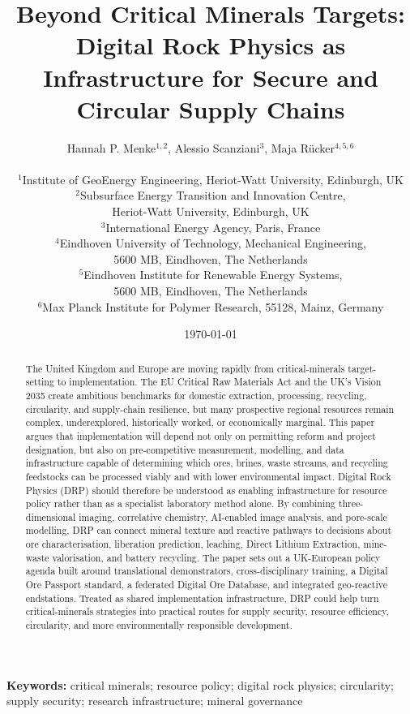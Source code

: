 \documentclass[12pt,a4paper]{article}
\title{\textbf{Beyond Critical Minerals Targets: Digital Rock Physics as Infrastructure for Secure and Circular Supply Chains}}
\author{%
Hannah P. Menke$^{1,2}$, Alessio Scanziani$^{3}$, Maja Rücker$^{4,5,6}$\\[0.7em]
\begin{tabular}{c}
\small $^{1}$Institute of GeoEnergy Engineering, Heriot-Watt University, Edinburgh, UK\\
\small $^{2}$Subsurface Energy Transition and Innovation Centre,\\
\small Heriot-Watt University, Edinburgh, UK\\
\small $^{3}$International Energy Agency, Paris, France\\
\small $^{4}$Eindhoven University of Technology, Mechanical Engineering,\\
\small 5600 MB, Eindhoven, The Netherlands\\
\small $^{5}$Eindhoven Institute for Renewable Energy Systems,\\
\small 5600 MB, Eindhoven, The Netherlands\\
\small $^{6}$Max Planck Institute for Polymer Research, 55128, Mainz, Germany
\end{tabular}}
\date{\today}
\begin{document}
\maketitle

\begin{abstract}
The United Kingdom and Europe are moving rapidly from critical-minerals target-setting to implementation. The EU Critical Raw Materials Act and the UK's Vision 2035 create ambitious benchmarks for domestic extraction, processing, recycling, circularity, and supply-chain resilience, but many prospective regional resources remain complex, underexplored, historically worked, or economically marginal. This paper argues that implementation will depend not only on permitting reform and project designation, but also on pre-competitive measurement, modelling, and data infrastructure capable of determining which ores, brines, waste streams, and recycling feedstocks can be processed viably and with lower environmental impact. Digital Rock Physics (DRP) should therefore be understood as enabling infrastructure for resource policy rather than as a specialist laboratory method alone. By combining three-dimensional imaging, correlative chemistry, AI-enabled image analysis, and pore-scale modelling, DRP can connect mineral texture and reactive pathways to decisions about ore characterisation, liberation prediction, leaching, Direct Lithium Extraction, mine-waste valorisation, and battery recycling. The paper sets out a UK-European policy agenda built around translational demonstrators, cross-disciplinary training, a Digital Ore Passport standard, a federated Digital Ore Database, and integrated geo-reactive endstations. Treated as shared implementation infrastructure, DRP could help turn critical-minerals strategies into practical routes for supply security, resource efficiency, circularity, and more environmentally responsible development.
\end{abstract}

\noindent\textbf{Keywords:} critical minerals; resource policy; digital rock physics; circularity; supply security; research infrastructure; mineral governance
\end{document}
